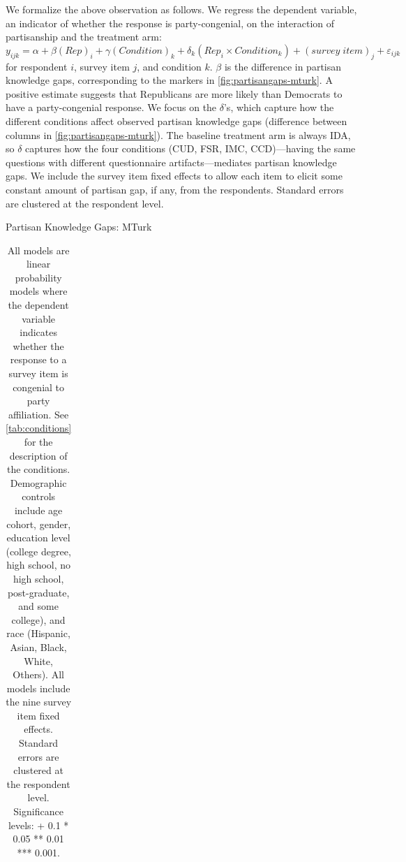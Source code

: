 \documentclass[12pt, letterpaper]{article}
\begin{document}
We formalize the above observation as follows. We regress the dependent variable, an indicator of whether the response is party-congenial, on the interaction of partisanship and the treatment arm:
\begin{equation}\label{eq:partisangap-mturk}
y_{ijk} = \alpha + \beta (Rep)_i + \gamma (Condition)_k + \delta_k (Rep_i \times Condition_k) + (survey \; item)_j + \varepsilon_{ijk}
\end{equation}
for respondent $i$, survey item $j$, and condition $k$. $\beta$ is the difference in partisan knowledge gaps, corresponding to the markers in \cref{fig:partisangaps-mturk}. A positive estimate suggests that Republicans are more likely than Democrats to have a party-congenial response. We focus on the $\delta$'s, which capture how the different conditions affect observed partisan knowledge gaps (difference between columns in \cref{fig:partisangaps-mturk}). The baseline treatment arm is always IDA, so $\delta$ captures how the four conditions (CUD, FSR, IMC, CCD)---having the same questions with different questionnaire artifacts---mediates partisan knowledge gaps.
We include the survey item fixed effects to allow each item to elicit some constant amount of partisan gap, if any, from the respondents. Standard errors are clustered at the respondent level.

\begin{table}[t] \centering \small \setlength\tabcolsep{0 pt} \setlength{\defaultaddspace}{0pt}
	\def\sym#1{\ifmmode^{#1}\else\(^{#1}\)\fi}
	\caption{Partisan Knowledge Gaps: MTurk}
	\label{tab:partisangaps-mturk}
	\begin{adjustbox}{max width=\textwidth}
		\begin{tabular}{l*{6}{D{.}{.}{-1}}}
			\toprule
			
			\bottomrule
		\end{tabular}
	\end{adjustbox}
	\caption*{\footnotesize All models are linear probability models where the dependent variable indicates whether the response to a survey item is congenial to party affiliation.
		See \cref{tab:conditions} for the description of the conditions.
	Demographic controls include age cohort, gender, education level (college degree, high school, no high school, post-graduate, and some college), and race (Hispanic, Asian, Black, White, Others). All models include the nine survey item fixed effects. Standard errors are clustered at the respondent level. Significance levels: + 0.1 * 0.05 ** 0.01 *** 0.001.}
\end{table}
\end{document}
